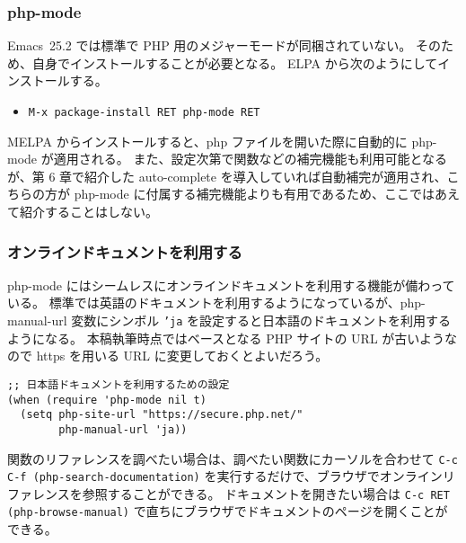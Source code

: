 \subsubsection{php-mode}
Emacs~25.2 では標準で PHP 用のメジャーモードが同梱されていない。
そのため、自身でインストールすることが必要となる。
ELPA から次のようにしてインストールする。
\begin{itemize}\setlength{\leftskip}{-1.00zw}%
\item[] \texttt{M-x package-install RET php-mode RET}
\end{itemize}
MELPA からインストールすると、php ファイルを開いた際に自動的に php-mode が適用される。
また、設定次第で関数などの補完機能も利用可能となるが、第 6 章で紹介した auto-complete を導入していれば自動補完が適用され、こちらの方が php-mode に付属する補完機能よりも有用であるため、ここではあえて紹介することはしない。
\subsubsection{オンラインドキュメントを利用する}
php-mode にはシームレスにオンラインドキュメントを利用する機能が備わっている。
標準では英語のドキュメントを利用するようになっているが、php-manual-url 変数にシンボル \texttt{'ja} を設定すると日本語のドキュメントを利用するようになる。
本稿執筆時点ではベースとなる PHP サイトの URL が古いようなので https を用いる URL に変更しておくとよいだろう。
\begin{mdframed}[roundcorner=0.50zw,leftmargin=3.00zw,rightmargin=3.00zw,skipabove=0.40zw,skipbelow=0.40zw,innertopmargin=4.00pt,innerbottommargin=4.00pt,innerleftmargin=5.00pt,innerrightmargin=5.00pt,linecolor=gray!020,linewidth=0.50pt,backgroundcolor=gray!20]
\begin{verbatim}
;; 日本語ドキュメントを利用するための設定
(when (require 'php-mode nil t)
  (setq php-site-url "https://secure.php.net/"
        php-manual-url 'ja))
\end{verbatim}
\end{mdframed}
関数のリファレンスを調べたい場合は、調べたい関数にカーソルを合わせて \texttt{C-c C-f (php-search-documentation)} を実行するだけで、ブラウザでオンラインリファレンスを参照することができる。
ドキュメントを開きたい場合は \texttt{C-c RET (php-browse-manual)} で直ちにブラウザでドキュメントのページを開くことができる。

